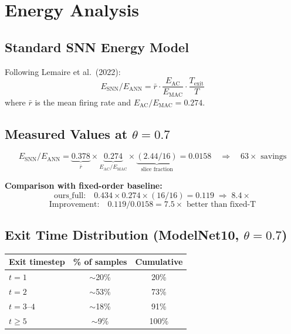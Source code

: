 \documentclass[11pt,a4paper]{article}
\begin{document}
\section{Energy Analysis}

\subsection{Standard SNN Energy Model}

Following Lemaire et al.\ (2022):
\[
  E_\text{SNN}/E_\text{ANN} = \bar{r} \cdot \frac{E_\text{AC}}{E_\text{MAC}} \cdot \frac{T_\text{exit}}{T}
\]
where $\bar{r}$ is the mean firing rate and $E_\text{AC}/E_\text{MAC} = 0.274$.

\subsection{Measured Values at $\theta = 0.7$}

\[
  E_\text{SNN}/E_\text{ANN}
  = \underbrace{0.378}_{\bar{r}} \times
    \underbrace{0.274}_{E_\text{AC}/E_\text{MAC}} \times
    \underbrace{(2.44/16)}_{\text{slice fraction}}
  = 0.0158 \quad\Rightarrow\quad 63\times \text{ savings}
\]

\textbf{Comparison with fixed-order baseline:}
\[
  \text{ours\_full:}\quad
  0.434 \times 0.274 \times (16/16) = 0.119 \;\Rightarrow\; 8.4\times
\]
\[
  \text{Improvement:}\quad 0.119 / 0.0158 = 7.5\times \text{ better than fixed-T}
\]

\subsection{Exit Time Distribution (ModelNet10, $\theta=0.7$)}

\begin{center}
\begin{tabular}{lcc}
\toprule
Exit timestep & \% of samples & Cumulative \\
\midrule
$t=1$ & $\sim$20\% & 20\% \\
$t=2$ & $\sim$53\% & 73\% \\
$t=3$--$4$ & $\sim$18\% & 91\% \\
$t \geq 5$ & $\sim$9\% & 100\% \\
\bottomrule
\end{tabular}
\end{center}
\end{document}

